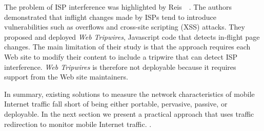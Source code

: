 The problem of ISP interference was highlighted by Reis~\etal~\cite{reis:tripwires}. 
The authors demonstrated that inflight changes made by ISPs tend to introduce vulnerabilities such as overflows and cross-site scripting (XSS) attacks. 
They proposed and deployed \emph{Web Tripwires}, Javascript code that detects in-flight page changes. 
The main limitation of their study is that the approach requires each Web site to modify their content to include a tripwire that can detect ISP interference. 
\emph{Web Tripwires} is therefore not deployable because it requires support from the Web site maintainers.

In summary, existing solutions to measure the network characteristics of mobile Internet traffic fall short of being either portable, pervasive, passive, or deployable. 
In the next section we present \platname a practical approach that uses traffic redirection to monitor mobile Internet traffic. 
.

